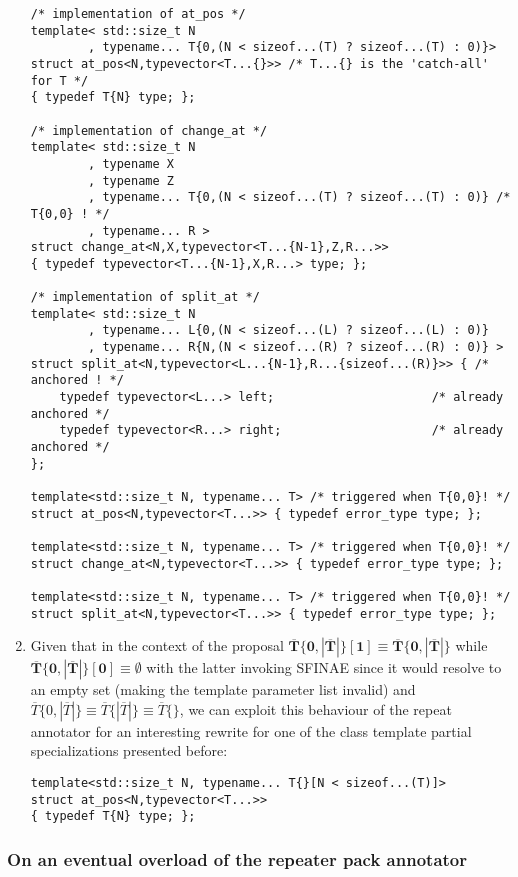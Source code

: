 \documentclass[ notitlepage
              , a4paper
              , twoside ]{article}
\newcommand{\parnum}{\bfseries\arabic{parcount}}
\newcounter{parcount}
\newcommand\p{%
    \stepcounter{parcount}%
    \leavevmode\marginpar[\hfill\parnum]{\parnum}%
}
\begin{document}
\begin{enumerate}
\begin{verbatim}
/* implementation of at_pos */
template< std::size_t N
        , typename... T{0,(N < sizeof...(T) ? sizeof...(T) : 0)}>
struct at_pos<N,typevector<T...{}>> /* T...{} is the 'catch-all' for T */
{ typedef T{N} type; };

/* implementation of change_at */
template< std::size_t N
        , typename X
        , typename Z
        , typename... T{0,(N < sizeof...(T) ? sizeof...(T) : 0)} /* T{0,0} ! */
        , typename... R >
struct change_at<N,X,typevector<T...{N-1},Z,R...>>
{ typedef typevector<T...{N-1},X,R...> type; };

/* implementation of split_at */
template< std::size_t N
        , typename... L{0,(N < sizeof...(L) ? sizeof...(L) : 0)}
        , typename... R{N,(N < sizeof...(R) ? sizeof...(R) : 0)} >
struct split_at<N,typevector<L...{N-1},R...{sizeof...(R)}>> { /* anchored ! */
    typedef typevector<L...> left;                      /* already anchored */
    typedef typevector<R...> right;                     /* already anchored */
};

template<std::size_t N, typename... T> /* triggered when T{0,0}! */
struct at_pos<N,typevector<T...>> { typedef error_type type; };

template<std::size_t N, typename... T> /* triggered when T{0,0}! */
struct change_at<N,typevector<T...>> { typedef error_type type; };

template<std::size_t N, typename... T> /* triggered when T{0,0}! */
struct split_at<N,typevector<T...>> { typedef error_type type; };

\end{verbatim}
\item\p Given that in the context of the proposal $\bm{\overline{T}\{0,|\overline{T}|\}[1] \equiv \overline{T}\{0,|\overline{T}|\}}$ while $\bm{\overline{T}\{0,|\overline{T}|\}[0] \equiv \emptyset{}}$ with the latter invoking SFINAE since it would resolve to an empty set (making the template parameter list invalid) and $\overline{T}\{0,|\overline{T}|\}\equiv{\overline{T}\{|\overline{T}|\}}\equiv{\overline{T}\{\}}$, we can exploit this behaviour of the repeat annotator for an interesting rewrite for one of the class template partial specializations presented before:
\begin{verbatim}
template<std::size_t N, typename... T{}[N < sizeof...(T)]>
struct at_pos<N,typevector<T...>>
{ typedef T{N} type; };
\end{verbatim}
\end{enumerate}

\subsubsection{On an eventual overload of the repeater pack annotator}
\end{document}
